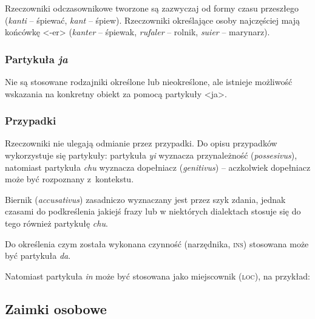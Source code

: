 \begin{spacing}{1.1}
Rzeczowniki odczasownikowe tworzone są zazwyczaj od formy czasu przeszłego
(\emph{kanti} -- śpiewać, \emph{kant} -- śpiew). Rzeczowniki określające osoby
najczęściej mają końcówkę <-er> (\emph{kanter} -- śpiewak, \emph{rufaler} --
rolnik, \emph{suier} -- marynarz).

\subsubsection{Partykuła \emph{ja}}

Nie są stosowane rodzajniki określone lub nieokreślone, ale istnieje możliwość
wskazania na konkretny obiekt za pomocą partykuły <ja>.


\subsubsection{Przypadki}

Rzeczowniki nie ulegają odmianie przez przypadki. Do opisu przypadków
wykorzystuje się partykuły: partykuła \emph{yi} wyznacza przynależność
(\emph{possesivus}), natomiast partykuła \emph{chu} wyznacza dopełniacz
(\emph{genitivus}) -- aczkolwiek dopełniacz może być rozpoznany z~kontekstu.

Biernik (\emph{accusativus}) zasadniczo wyznaczany jest przez szyk zdania,
jednak czasami do podkreślenia jakiejś frazy lub w niektórych dialektach stosuje
się do tego również partykułę \emph{chu}.




Do określenia czym została wykonana czynność (narzędnika, \textsc{ins})
stosowana może być partykuła \emph{da}.


Natomiast partykuła \emph{in} może być stosowana jako miejscownik
(\textsc{loc}), na przykład:


\subsection{Zaimki osobowe}


\end{spacing}
